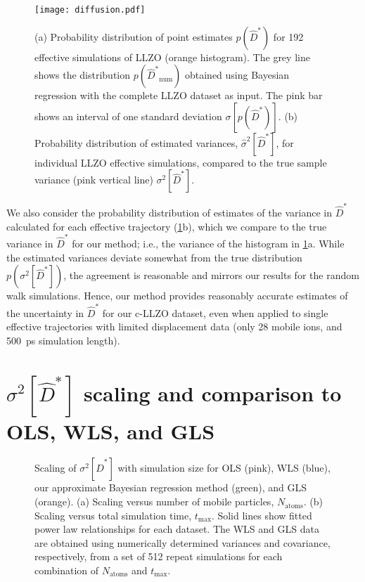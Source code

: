 \documentclass[reprint,superscriptaddress,nobibnotes,amsmath,amssymb,aps,prx,hidelinks]{revtex4-2}
\newcommand{\prob}[1]{\ensuremath{p(#1)}}
\newcommand{\Dest}{\ensuremath{\widehat{D}^*}}
\newcommand{\var}[1]{\ensuremath{\sigma^2[#1]}}
\newcommand{\varest}[1]{\ensuremath{\widehat{\sigma}^2[#1]}}
\begin{document}
\begin{figure}[tb]
    \centering
    \texttt{[image: diffusion.pdf]}
    \caption{
      (a) Probability distribution of point estimates $\prob{\Dest}$ for \num{192} effective simulations of LLZO (orange histogram).
      The grey line shows the distribution $\prob{\Dest_\mathrm{num}}$ obtained using Bayesian regression with the complete LLZO dataset as input.
      The pink bar shows an interval of one standard deviation $\sigma[\prob{\Dest}]$.
      (b) Probability distribution of estimated variances, $\varest{\Dest}$, for individual LLZO effective simulations, compared to the true sample variance (pink vertical line) $\var{\Dest}$.
    }
    \label{fig:diffusion}
\end{figure}

We also consider the probability distribution of estimates of the variance in $\Dest$ calculated for each effective trajectory (\cref{fig:diffusion}b), which we compare to the true variance in $\Dest$ for our method; i.e., the variance of the histogram in \cref{fig:diffusion}a.
While the estimated variances deviate somewhat from the true distribution $\prob{\var{\Dest}}$, the agreement is reasonable and mirrors our results for the random walk simulations.
Hence, our method provides reasonably accurate estimates of the uncertainty in $\Dest$ for our c-LLZO dataset, even when applied to single effective trajectories with limited displacement data (only 28 mobile ions, and \SI{500}{ps} simulation length).

\section{$\var{\Dest}$ scaling and comparison to OLS, WLS, and GLS}

\begin{figure}[htb]
    \centering
    \caption{
      Scaling of $\var{\Dest}$ with simulation size for OLS (pink), WLS (blue), our approximate Bayesian regression method (green), and GLS (orange).
      (a) Scaling versus number of mobile particles, $N_\mathrm{atoms}$.
      (b) Scaling versus total simulation time, $t_\mathrm{max}$.
      Solid lines show fitted power law relationships for each dataset.
      The WLS and GLS data are obtained using numerically determined variances and covariance, respectively, from a set of \num{512} repeat simulations for each combination of $N_\mathrm{atoms}$ and $t_\mathrm{max}$.
    }
    \label{fig:stat_eff}
\end{figure}
\end{document}
